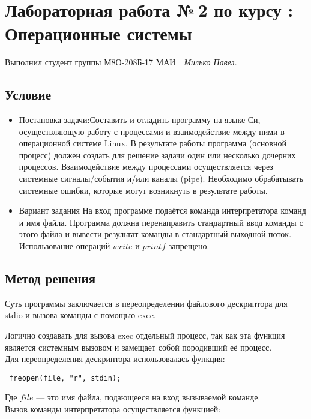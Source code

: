 \documentclass[12pt]{article}
\begin{document}
\section*{\centering Лабораторная работа №\,2 по курсу :\\ Операционные системы}

Выполнил студент группы М8О-208Б-17 МАИ \,\, \textit{Милько Павел}.

\subsection*{Условие}

\begin{itemize}
    \item Постановка задачи:\subitem Составить и отладить программу на языке Си, осуществляющую работу с процессами и взаимодействие между ними в операционной системе Linux. В результате работы программа (основной процесс) должен создать для решение задачи один или несколько дочерних процессов. Взаимодействие между процессами осуществляется через системные сигналы/события и/или каналы (pipe).
    Необходимо обрабатывать системные ошибки, которые могут возникнуть в результате работы. 
    
    \item Вариант задания  \subitem На вход программе подаётся команда интерпретатора команд и имя файла. Программа должна перенаправить стандартный ввод команды с этого файла и вывести результат команды в стандартный выходной поток. Использование операций $write$ и $printf$ запрещено.
\end{itemize}

\subsection*{Метод решения}

Суть программы заключается в переопределении файлового дескриптора для stdio и вызова команды с помощью exec.

Логично создавать для вызова exec отдельный процесс, так как эта функция является системным вызовом и замещает собой породивший её процесс.
\\
Для переопределения дескриптора использовалась функция:

\lstinline| freopen(file, "r", stdin);|

Где $file$ --- это имя файла, подающееся на вход вызываемой команде.\\
Вызов команды интерпретатора осуществляется функцией:
\end{document}
